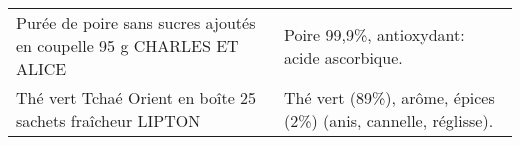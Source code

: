 \begin{longtable}{p{5cm}p{10cm}}
                                     Purée de poire sans sucres ajoutés en coupelle 95 g CHARLES ET ALICE &                                                                                                                                                                                                                                                                                                                                                                                                                                                                                                                                                                                                                                                                                                                                                                                                                                                                                                                                                                                              Poire 99,9\%, antioxydant: acide ascorbique. \\
                                              Thé vert Tchaé Orient en  boîte 25 sachets fraîcheur LIPTON &                                                                                                                                                                                                                                                                                                                                                                                                                                                                                                                                                                                                                                                                                                                                                                                                                                                                                                                                                                           Thé vert (89\%), arôme, épices (2\%) (anis, cannelle, réglisse). \\

\end{longtable}

